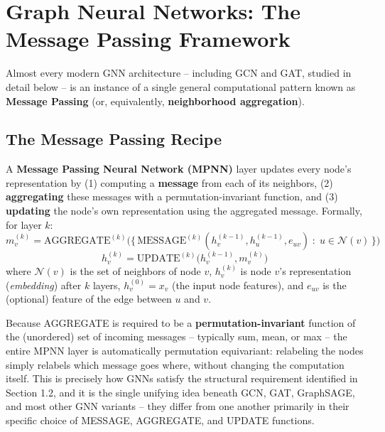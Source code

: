 \documentclass[12pt,a4paper]{article}
\begin{document}
\newpage

\section{Graph Neural Networks: The Message Passing Framework}

Almost every modern GNN architecture -- including GCN and GAT, studied in detail below -- is an instance of a single general computational pattern known as \textbf{Message Passing} (or, equivalently, \textbf{neighborhood aggregation}).

\subsection{The Message Passing Recipe}

\begin{defbox}
A \textbf{Message Passing Neural Network (MPNN)} layer updates every node's representation by (1) computing a \textbf{message} from each of its neighbors, (2) \textbf{aggregating} these messages with a permutation-invariant function, and (3) \textbf{updating} the node's own representation using the aggregated message. Formally, for layer $k$:
\[
m_v^{(k)} = \text{AGGREGATE}^{(k)}\Big(\big\{\, \text{MESSAGE}^{(k)}(h_v^{(k-1)}, h_u^{(k-1)}, e_{uv}) \;:\; u \in \mathcal{N}(v) \,\big\}\Big)
\]
\[
h_v^{(k)} = \text{UPDATE}^{(k)}\big(h_v^{(k-1)}, m_v^{(k)}\big)
\]
where $\mathcal{N}(v)$ is the set of neighbors of node $v$, $h_v^{(k)}$ is node $v$'s representation (\emph{embedding}) after $k$ layers, $h_v^{(0)} = x_v$ (the input node features), and $e_{uv}$ is the (optional) feature of the edge between $u$ and $v$.
\end{defbox}

\begin{keyidea}
Because AGGREGATE is required to be a \textbf{permutation-invariant} function of the (unordered) set of incoming messages -- typically sum, mean, or max -- the entire MPNN layer is automatically permutation equivariant: relabeling the nodes simply relabels which message goes where, without changing the computation itself. This is precisely how GNNs satisfy the structural requirement identified in Section 1.2, and it is the single unifying idea beneath GCN, GAT, GraphSAGE, and most other GNN variants -- they differ from one another primarily in their specific choice of MESSAGE, AGGREGATE, and UPDATE functions.
\end{keyidea}
\end{document}
